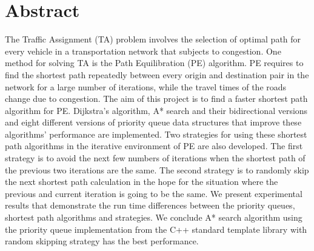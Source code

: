 \chapter*{Abstract}
The Traffic Assignment (TA) problem involves the selection of optimal path for every vehicle in a transportation network that subjects to congestion.
One method for solving TA is the Path Equilibration (PE) algorithm.
PE requires to find the shortest path repeatedly between every origin and destination pair in the network for a large number of iterations,
while the travel times of the roads change due to congestion.
The aim of this project is to find a faster shortest path algorithm for PE.
Dijkstra's algorithm, A* search and their bidirectional versions and eight different versions of priority queue data structures that improve these algorithms' performance are implemented.
Two strategies for using these shortest path algorithms in the iterative environment of PE are also developed.
The first strategy is to avoid the next few numbers of iterations when the shortest path of the previous two iterations are the same.
The second strategy is to randomly skip the next shortest path calculation in the hope for the situation where the previous and current iteration is going to be the same.
We present experimental results that demonstrate the run time differences between the priority queues, shortest path algorithms and strategies.
We conclude A* search algorithm using the priority queue implementation from the C++ standard template library with random skipping strategy has the best performance.
